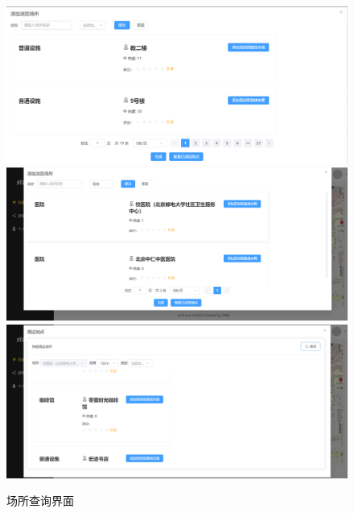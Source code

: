 \documentclass{report}
\begin{document}
\begin{figure}[h]
    \begin{center}
        \includegraphics*[width=\textwidth]{figure/2.3-qr.png}
        \includegraphics*[width=\textwidth]{figure/2.3-fl1.png}
        \includegraphics*[width=\textwidth]{figure/2.3-fl2.png}
    \end{center}
    \caption{场所查询界面}
\end{figure}
\end{document}

